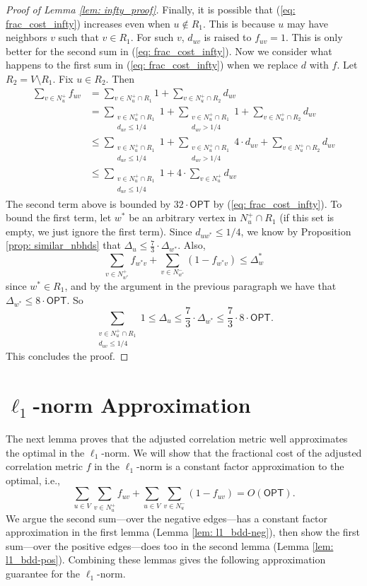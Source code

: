 \begin{proof}[Proof of Lemma \ref{lem: infty_proof}]
Finally, it is possible that (\ref{eq: frac_cost_infty}) increases even when $u \not \in R_1$. This is because $u$ may have neighbors $v$ such that $v \in R_1$. For such $v$, $d_{uv}$ is raised to $f_{uv}=1$. This is only better for the second sum in (\ref{eq: frac_cost_infty}). Now we consider what happens to the first sum in (\ref{eq: frac_cost_infty}) when we replace $d$ with $f$. Let $R_2 = V \setminus R_1$. Fix $u \in R_2$. Then
\begin{align*}
    \sum_{v \in N_u^+} f_{uv} &= \sum_{v \in N_u^+ \cap R_1} 1 + \sum_{v \in N_u^+ \cap R_2} d_{uv} \\
    &= \sum_{\substack{v \in N_u^+ \cap R_1 \\ d_{uv} \leq 1/4}} 1 + \sum_{\substack{v \in N_u^+ \cap R_1 \\ d_{uv} > 1/4}} 1 + \sum_{v \in N_u^+ \cap R_2} d_{uv} \\
    &\leq \sum_{\substack{v \in N_u^+ \cap R_1 \\ d_{uv} \leq 1/4}} 1 + \sum_{\substack{v \in N_u^+ \cap R_1 \\ d_{uv} > 1/4}} 4 \cdot d_{uv} + \sum_{v \in N_u^+ \cap R_2} d_{uv} \\
    &\leq \sum_{\substack{v \in N_u^+ \cap R_1 \\ d_{uv} \leq 1/4}} 1 + 4 \cdot \sum_{v \in N_u^+} d_{uv}
\end{align*}
The second term above is bounded by $32 \cdot \textsf{OPT}$ by (\ref{eq: frac_cost_infty}). To bound the first term, let $w^*$ be an arbitrary vertex in $N_u^+ \cap R_1$ (if this set is empty, we just ignore the first term). Since $d_{uw^*} \leq 1/4$, we know by Proposition \ref{prop: similar_nbhds} that $\Delta_u \leq \frac{7}{3} \cdot \Delta_{w^*}$. Also, 
$$ \sum_{v \in N_{w^*}^+} f_{w^*v} + \sum_{v \in N_{w^*}^-} (1-f_{w^*v})  \leq \Delta_w^*$$ 
since $w^* \in R_1$, and by the argument in the previous paragraph we have that $\Delta_{w^*} \leq 8 \cdot \textsf{OPT}$. So
\[\sum_{\substack{v \in N_u^+ \cap R_1 \\ d_{uv} \leq 1/4}} 1 \leq \Delta_u \leq \frac{7}{3} \cdot \Delta_{w^*} \leq \frac{7}{3} \cdot 8 \cdot \textsf{OPT}.\] This concludes the proof. 
\end{proof}
  

\section{$\ell_1$-norm Approximation}\label{sec:l1-norm}
The next lemma proves that the adjusted correlation metric well approximates the optimal in the $\ell_1$-norm.
We will show that the fractional cost of the adjusted correlation metric $f$ in the $\ell_1$-norm is a constant factor approximation to the optimal, i.e., 
    $$\sum_{u \in V} \sum_{v \in N_u^+} f_{uv} + \sum_{u \in V} \sum_{v \in N_u^-} (1-f_{uv}) = O(\textsf{OPT}).$$
We argue the second sum---over the negative edges---has a constant factor approximation in the first lemma (Lemma \ref{lem: l1_bdd-neg}), then show the first sum---over the positive edges---does too in the second lemma (Lemma \ref{lem: l1_bdd-pos}). 
Combining these lemmas gives the following approximation guarantee for the $\ell_1$-norm.


